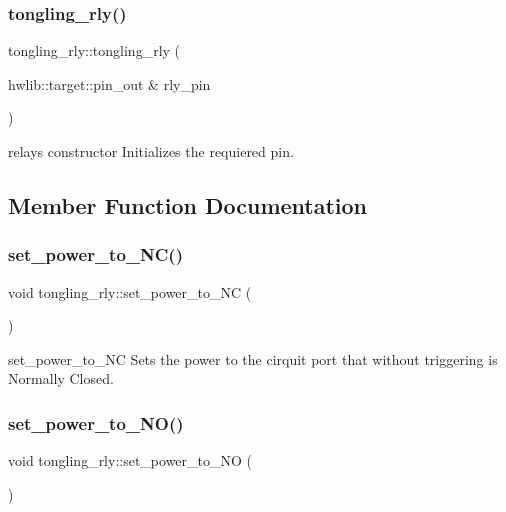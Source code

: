 \subsubsection{\texorpdfstring{tongling\+\_\+rly()}{tongling\_rly()}}
{\footnotesize\ttfamily tongling\+\_\+rly\+::tongling\+\_\+rly (\begin{DoxyParamCaption}\item[{hwlib\+::target\+::pin\+\_\+out \&}]{rly\+\_\+pin }\end{DoxyParamCaption})}



relays constructor Initializes the requiered pin. 



\subsection{Member Function Documentation}
\mbox{\label{classtongling__rly_ae7482fcf1b9d316872e86e17f1a96359}} 
\subsubsection{\texorpdfstring{set\+\_\+power\+\_\+to\+\_\+\+N\+C()}{set\_power\_to\_NC()}}
{\footnotesize\ttfamily void tongling\+\_\+rly\+::set\+\_\+power\+\_\+to\+\_\+\+NC (\begin{DoxyParamCaption}{ }\end{DoxyParamCaption})}



set\+\_\+power\+\_\+to\+\_\+\+NC Sets the power to the cirquit port that without triggering is Normally Closed. 

\mbox{\label{classtongling__rly_a1751d746b187225c18f631d8b2a921e9}} 
\subsubsection{\texorpdfstring{set\+\_\+power\+\_\+to\+\_\+\+N\+O()}{set\_power\_to\_NO()}}
{\footnotesize\ttfamily void tongling\+\_\+rly\+::set\+\_\+power\+\_\+to\+\_\+\+NO (\begin{DoxyParamCaption}{ }\end{DoxyParamCaption})}



